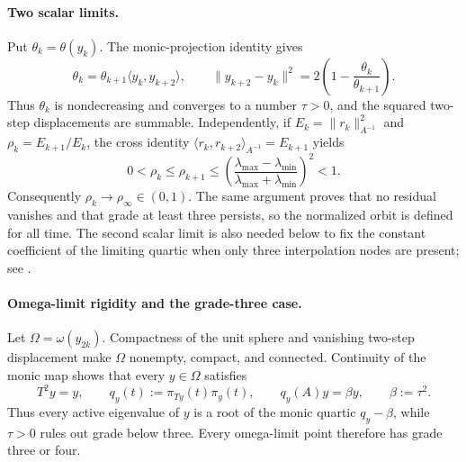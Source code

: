 \documentclass[11pt]{article}
\begin{document}
\paragraph{Two scalar limits.}
Put \(\theta_k=\theta(y_k)\).  The monic-projection identity gives
\[
 \theta_k=\theta_{k+1}\langle y_k,y_{k+2}\rangle,\qquad
 \lVert y_{k+2}-y_k\rVert^2
 =2\left(1-\frac{\theta_k}{\theta_{k+1}}\right).
\]
Thus \(\theta_k\) is nondecreasing and converges to a number \(\tau>0\),
and the squared two-step displacements are summable.  Independently, if
\(E_k=\lVert r_k\rVert_{A^{-1}}^2\) and
\(\rho_k=E_{k+1}/E_k\), the cross identity
\(\langle r_k,r_{k+2}\rangle_{A^{-1}}=E_{k+1}\) yields
\[
 0<\rho_k\leq\rho_{k+1}\leq
 \left(\frac{\lambda_{\max}-\lambda_{\min}}
 {\lambda_{\max}+\lambda_{\min}}\right)^2<1.
\]
Consequently \(\rho_k\to\rho_\infty\in(0,1)\).  The same argument proves
that no residual vanishes and that grade at least three persists, so the
normalized orbit is defined for all time.  The second scalar limit is also
needed below to fix the constant coefficient of the limiting quartic when
only three interpolation nodes are present; see
.

\paragraph{Omega-limit rigidity and the grade-three case.}
Let \(\Omega=\omega(y_{2k})\).  Compactness of the unit sphere and vanishing
two-step displacement make \(\Omega\) nonempty, compact, and connected.
Continuity of the monic map shows that every \(y\in\Omega\) satisfies
\[
 T^2y=y,\qquad
 q_y(t):=\pi_{Ty}(t)\pi_y(t),\qquad
 q_y(A)y=\beta y,\qquad \beta:=\tau^2.
\]
Thus every active eigenvalue of \(y\) is a root of the monic quartic
\(q_y-\beta\), while \(\tau>0\) rules out grade below three.  Every
omega-limit point therefore has grade three or four.
\end{document}
